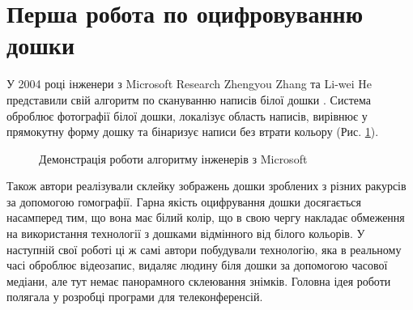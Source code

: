\section{Перша робота по оцифровуванню дошки}
У 2004 році інженери з Microsoft Research Zhengyou Zhang
та Li-wei He представили свій алгоритм по скануванню написів
білої дошки \cite{zhang:2004}. Система оброблює фотографії білої дошки, локалізує область
написів, вирівнює у прямокутну форму дошку та бінаризує написи без втрати
кольору (Рис. \ref{fig:zhang:2004}).
\begin{figure}[H]
  \centering
  \caption{Демонстрація роботи алгоритму інженерів з Microsoft \cite{zhang:2004}
    \label{fig:zhang:2004}
  }
\end{figure}
Також автори реалізували склейку зображень дошки зроблених з різних
ракурсів за допомогою гомографії. Гарна якість оцифрування дошки
досягається насамперед тим, що вона має білий колір, що в свою чергу
накладає обмеження на використання технології з дошками відмінного
від білого кольорів.
У наступній свої роботі \cite{zhang:2007} ці ж самі автори побудували
технологію, яка в реальному часі оброблює відеозапис, видаляє людину біля
дошки за допомогою часової медіани, але тут немає
панорамного склеювання знімків. Головна ідея роботи полягала у розробці
програми для телеконференсій.

